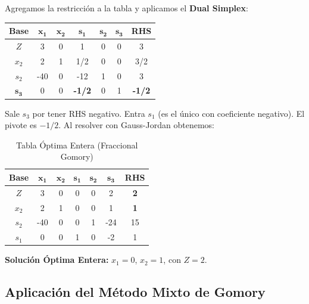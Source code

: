 \documentclass[10pt,a4paper]{article}
\begin{document}
Agregamos la restricción a la tabla y aplicamos el \textbf{Dual Simplex}:

\begin{table}[H]
    \centering
    \begin{tabular}{c c c c c c | c}
    \toprule
    \textbf{Base} & $\mathbf{x_1}$ & $\mathbf{x_2}$ & $\mathbf{s_1}$ & $\mathbf{s_2}$ & $\mathbf{s_3}$ & \textbf{RHS} \\
    \midrule
    $Z$   & 3 & 0 & 1 & 0 & 0 & 3 \\
    $x_2$ & 2 & 1 & 1/2 & 0 & 0 & 3/2 \\
    $s_2$ & -40 & 0 & -12 & 1 & 0 & 3 \\
    $\mathbf{s_3}$ & 0 & 0 & \textbf{-1/2} & 0 & 1 & \textbf{-1/2} \\
    \bottomrule
    \end{tabular}
\end{table}

Sale $s_3$ por tener RHS negativo. Entra $s_1$ (es el único con coeficiente negativo). El pivote es $-1/2$. Al resolver con Gauss-Jordan obtenemos:

\begin{table}[H]
    \centering
    \begin{tabular}{c c c c c c | c}
    \toprule
    \textbf{Base} & $\mathbf{x_1}$ & $\mathbf{x_2}$ & $\mathbf{s_1}$ & $\mathbf{s_2}$ & $\mathbf{s_3}$ & \textbf{RHS} \\
    \midrule
    $Z$   & 3 & 0 & 0 & 0 & 2 & \textbf{2} \\
    $x_2$ & 2 & 1 & 0 & 0 & 1 & \textbf{1} \\
    $s_2$ & -40 & 0 & 0 & 1 & -24 & 15 \\
    $s_1$ & 0 & 0 & 1 & 0 & -2 & 1 \\
    \bottomrule
    \end{tabular}
    \caption{Tabla Óptima Entera (Fraccional Gomory)}
\end{table}

\textbf{Solución Óptima Entera:} $x_1 = 0$, $x_2 = 1$, con $Z = 2$.


\subsection{Aplicación del Método Mixto de Gomory}
\end{document}

